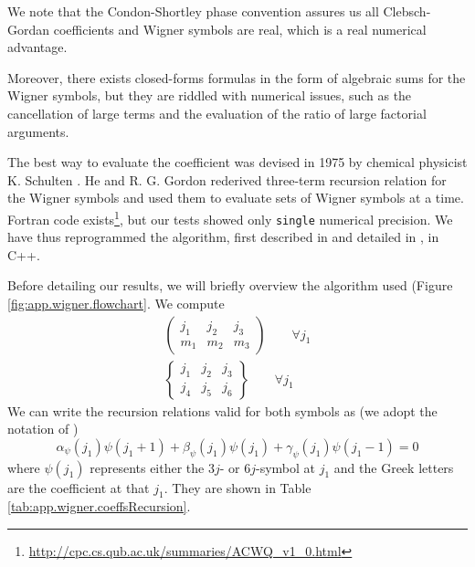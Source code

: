 We note that the Condon-Shortley phase convention 
assures us all Clebsch-Gordan coefficients and 
Wigner symbols are real, which is a real numerical
advantage. 

Moreover, there exists closed-forms formulas in the form of algebraic
sums for the Wigner symbols, but they are riddled with numerical 
issues, such as the cancellation of large terms and the evaluation 
of the ratio of large factorial arguments. 

The best way to evaluate the coefficient was devised in 1975
by chemical physicist K. Schulten \cite{SCH1975}. 
He and R. G. Gordon 
rederived three-term recursion relation for the Wigner symbols 
and used them to evaluate sets of Wigner symbols at a time.
Fortran 
code exists\footnote{\url{http://cpc.cs.qub.ac.uk/summaries/ACWQ_v1_0.html}}, 
but our tests showed only \texttt{single} numerical precision. We have
thus reprogrammed the algorithm, first described in \cite{SCH1975}
and detailed in \cite{SCH1976}, in C++. 

Before detailing our results, we will briefly overview
the algorithm used (\see Figure \ref{fig:app.wigner.flowchart}. We compute
  \begin{align*}
    \begin{pmatrix}j_1 & j_2 & j_3 \\ m_1 & m_2 & m_3 \end{pmatrix} \qquad \forall j_1 \\
    \begin{Bmatrix}j_1 & j_2 & j_3 \\ j_4 & j_5 & j_6 \end{Bmatrix} \qquad \forall j_1
  \end{align*}
We can write the recursion relations valid for both symbols as 
(we adopt the notation of \cite{LUS1998})
  \begin{equation}
    \alpha_\psi(j_1)\psi(j_1+1)+\beta_\psi(j_1)\psi(j_1)+\gamma_\psi(j_1)\psi(j_1-1)=0
  \end{equation}
where $\psi(j_1)$ represents either the $3j$- or $6j$-symbol at $j_1$
and the Greek letters are the coefficient at that $j_1$. They are
shown in Table \ref{tab:app.wigner.coeffsRecursion}. 

